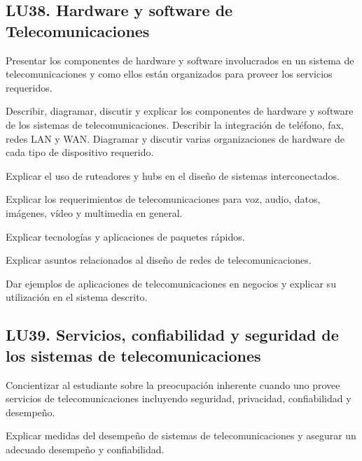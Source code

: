 \subsection{LU38. Hardware y software de Telecomunicaciones}\label{sec:BOK-LU38}\label{sec:LU38}
\begin{LearningUnit}
\begin{LUGoal}
\item Presentar los componentes de hardware y software involucrados en un sistema de telecomunicaciones y como ellos están organizados para proveer los servicios requeridos.
\end{LUGoal}

\begin{LUObjective}
\item Describir, diagramar, discutir y explicar los componentes de hardware y software de los sistemas de telecomunicaciones. Describir la integración de teléfono, fax, redes LAN y WAN. Diagramar y discutir  varias organizaciones de hardware de cada tipo de dispositivo requerido.
\item Explicar el uso de ruteadores y hubs en el diseño de sistemas interconectados.
\item Explicar los requerimientos de telecomunicaciones para voz, audio, datos, imágenes, vídeo y multimedia en general.
\item Explicar tecnologías y aplicaciones de paquetes rápidos.
\item Explicar asuntos relacionados al diseño de redes de telecomunicaciones.
\item Dar ejemplos de aplicaciones de telecomunicaciones en negocios y explicar su utilización en el sistema descrito.
\end{LUObjective}
\end{LearningUnit}

\subsection{LU39. Servicios, confiabilidad y seguridad de los sistemas de telecomunicaciones}\label{sec:BOK-LU39}\label{sec:LU39}
\begin{LearningUnit}
\begin{LUGoal}
\item Concientizar al estudiante sobre la preocupación inherente cuando uno provee servicios de telecomunicaciones incluyendo seguridad, privacidad, confiabilidad y desempeño.
\end{LUGoal}

\begin{LUObjective}
\item Explicar medidas del desempeño de sistemas de telecomunicaciones y asegurar un adecuado desempeño y confiabilidad.
\end{LUObjective}
\end{LearningUnit}


